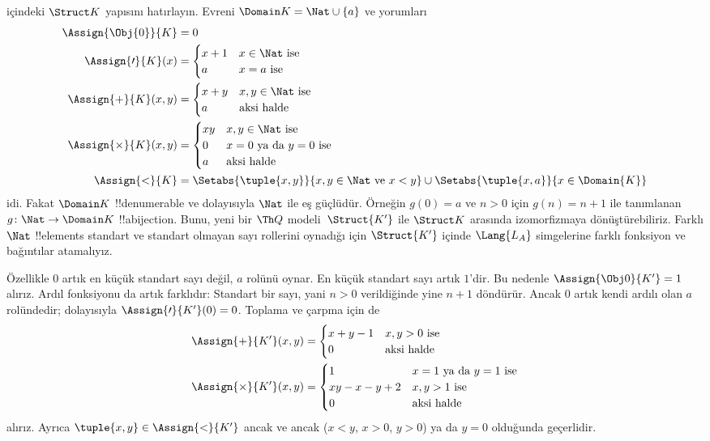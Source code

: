 \documentclass[../../../include/open-logic-section]{subfiles}
\begin{document}
\begin{ex}
 içindeki $\Struct K$ yapısını hatırlayın.
Evreni $\Domain K=\Nat\cup\{a\}$ ve yorumları
\begin{align*}
  \Assign{\Obj{0}}{K} & = 0\\
  \Assign{\prime}{K}(x) & =
  \begin{cases}
    x+1 & \text{$x\in\Nat$ ise}\\
    a & \text{$x=a$ ise}
  \end{cases}\\
  \Assign{+}{K}(x, y) & =
  \begin{cases}
    x+y & \text{$x,y\in\Nat$ ise}\\
    a & \text{aksi halde}
  \end{cases}\\
  \Assign{\times}{K}(x, y) & =
  \begin{cases}
    xy & \text{$x,y\in\Nat$ ise}\\
    0 & \text{$x=0$ ya da $y=0$ ise}\\
    a & \text{aksi halde}\\
  \end{cases}\\
  \Assign{<}{K} & =
  \Setabs{\tuple{x,y}}{x, y \in \Nat \text{ ve } x<y} \cup
  \Setabs{\tuple{x,a}}{x \in \Domain{K}}
\end{align*}
idi. Fakat $\Domain K$ !!{denumerable} ve dolayısıyla $\Nat$ ile eş
güçlüdür. Örneğin $g(0)=a$ ve $n>0$ için $g(n)=n+1$ ile tanımlanan
$g\colon\Nat\to\Domain K$ !!a{bijection}. Bunu, yeni bir $\Th Q$
modeli~$\Struct{K'}$ ile $\Struct K$ arasında izomorfizmaya
dönüştürebiliriz. Farklı $\Nat$ !!{element}s standart ve standart
olmayan sayı rollerini oynadığı için $\Struct{K'}$ içinde
$\Lang{L_A}$ simgelerine farklı fonksiyon ve bağıntılar atamalıyız.

Özellikle $0$ artık en küçük standart sayı değil, $a$ rolünü oynar.
En küçük standart sayı artık $1$'dir. Bu nedenle
$\Assign{\Obj0}{K'}=1$ alırız. Ardıl fonksiyonu da artık farklıdır:
Standart bir sayı, yani $n>0$ verildiğinde yine $n+1$ döndürür. Ancak
$0$ artık kendi ardılı olan $a$ rolündedir; dolayısıyla
$\Assign{\prime}{K'}(0)=0$. Toplama ve çarpma için de
\begin{align*}
\Assign{+}{K'}(x, y) & =
  \begin{cases}
    x+y-1 & \text{$x,y>0$ ise}\\
    0 & \text{aksi halde}
  \end{cases}\\
  \Assign{\times}{K'}(x, y) & =
  \begin{cases}
    1 & \text{$x=1$ ya da $y=1$ ise}\\
    xy-x-y+2 & \text{$x,y>1$ ise}\\
    0 & \text{aksi halde}\\
  \end{cases}
\end{align*}
alırız. Ayrıca $\tuple{x,y}\in\Assign{<}{K'}$ ancak ve ancak
($x<y$, $x>0$, $y>0$) ya da $y=0$ olduğunda geçerlidir.


\end{ex}
\end{document}
